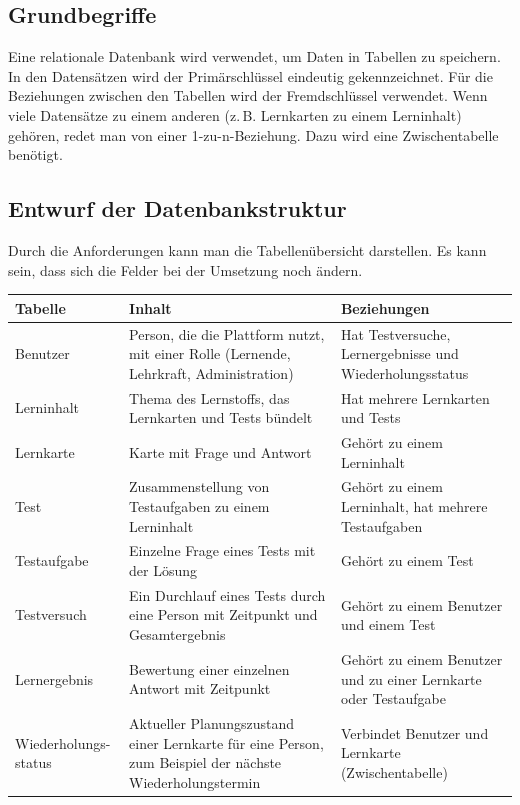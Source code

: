 \subsection{Grundbegriffe}
 
Eine relationale Datenbank wird verwendet, um Daten in Tabellen zu speichern. In den Datensätzen wird der Primärschlüssel eindeutig gekennzeichnet. Für die Beziehungen zwischen den Tabellen wird der Fremdschlüssel verwendet. Wenn viele Datensätze zu einem anderen (z.\,B. Lernkarten zu einem Lerninhalt) gehören, redet man von einer 1-zu-n-Beziehung. Dazu wird eine Zwischentabelle benötigt.
 
\subsection{Entwurf der Datenbankstruktur}
 
Durch die Anforderungen kann man die Tabellenübersicht darstellen. Es kann sein, dass sich die Felder bei der Umsetzung noch ändern.
 
\begin{center}
\small
\begin{tabular}{|p{3.0cm}|p{5.6cm}|p{5.0cm}|}
\hline
\textbf{Tabelle} & \textbf{Inhalt} & \textbf{Beziehungen} \\ \hline
Benutzer & Person, die die Plattform nutzt, mit einer Rolle (Lernende, Lehrkraft, Administration) & Hat Testversuche, Lernergebnisse und Wiederholungsstatus \\ \hline
Lerninhalt & Thema des Lernstoffs, das Lernkarten und Tests bündelt & Hat mehrere Lernkarten und Tests \\ \hline
Lernkarte & Karte mit Frage und Antwort & Gehört zu einem Lerninhalt \\ \hline
Test & Zusammenstellung von Testaufgaben zu einem Lerninhalt & Gehört zu einem Lerninhalt, hat mehrere Testaufgaben \\ \hline
Testaufgabe & Einzelne Frage eines Tests mit der Lösung & Gehört zu einem Test \\ \hline
Testversuch & Ein Durchlauf eines Tests durch eine Person mit Zeitpunkt und Gesamtergebnis & Gehört zu einem Benutzer und einem Test \\ \hline
Lernergebnis & Bewertung einer einzelnen Antwort mit Zeitpunkt & Gehört zu einem Benutzer und zu einer Lernkarte oder Testaufgabe \\ \hline
Wiederholungs-\newline status & Aktueller Planungszustand einer Lernkarte für eine Person, zum Beispiel der nächste Wiederholungstermin & Verbindet Benutzer und Lernkarte (Zwischentabelle) \\ \hline
\end{tabular}
\end{center}
 
